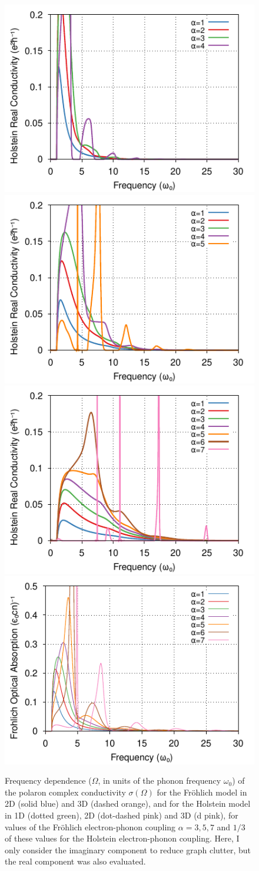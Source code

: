 \begin{figure}[!tbp]
    \centering
    \includegraphics[width=.49\textwidth]{figures/holstein-1d-real-conductivity-freq-COLOUR.pdf}
    \includegraphics[width=.49\textwidth]{figures/holstein-2d-real-conductivity-freq-COLOUR.pdf}
    \includegraphics[width=.49\textwidth]{figures/holstein-3d-real-conductivity-freq-COLOUR.pdf}
    \includegraphics[width=.49\textwidth]{figures/frohlich-3d-real-conductivity-freq-COLOUR.pdf}
    \caption{Frequency dependence ($\Omega$, in units of the phonon frequency $\omega_0$) of the polaron complex conductivity $\sigma(\Omega)$ for the Fr\"ohlich model in 2D (solid blue) and 3D (dashed orange), and for the Holstein model in 1D (dotted green), 2D (dot-dashed pink) and 3D (d pink), for values of the Fr\"ohlich electron-phonon coupling $\alpha = 3, 5, 7$ and $1/3$ of these values for the Holstein electron-phonon coupling. Here, I only consider the imaginary component to reduce graph clutter, but the real component was also evaluated.}
    \label{fig:re_con_freq}
\end{figure}
